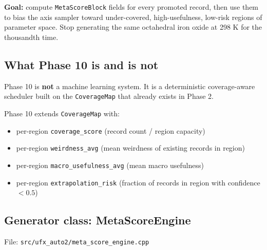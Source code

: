 \documentclass[11pt, a4paper]{article}
\begin{document}
\begin{tierbox}
\textbf{Goal:} compute \texttt{MetaScoreBlock} fields for every promoted record,
then use them to bias the axis sampler toward under-covered, high-usefulness,
low-risk regions of parameter space.  Stop generating the same octahedral iron
oxide at 298 K for the thousandth time.
\end{tierbox}

\subsection{What Phase 10 is and is not}

Phase 10 is \textbf{not} a machine learning system.  It is a deterministic
coverage-aware scheduler built on the \texttt{CoverageMap} that already exists
in Phase 2.

Phase 10 extends \texttt{CoverageMap} with:
\begin{itemize}[leftmargin=*, itemsep=2pt]
  \item per-region \texttt{coverage\_score} (record count / region capacity)
  \item per-region \texttt{weirdness\_avg} (mean weirdness of existing records in region)
  \item per-region \texttt{macro\_usefulness\_avg} (mean macro usefulness)
  \item per-region \texttt{extrapolation\_risk} (fraction of records in region with
		confidence $< 0.5$)
\end{itemize}

\subsection{Generator class: MetaScoreEngine}

File: \texttt{src/ufx\_auto2/meta\_score\_engine.cpp}
\end{document}

